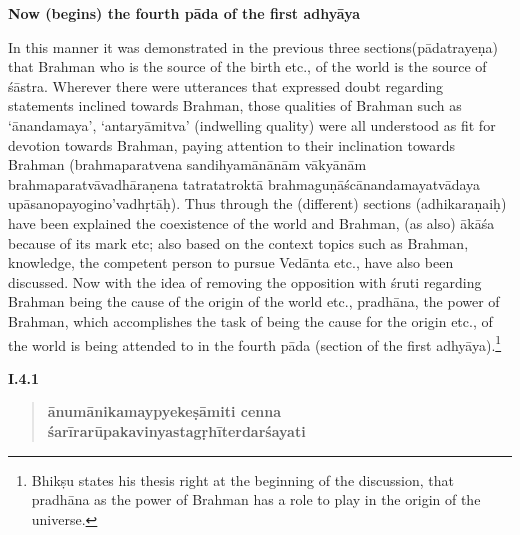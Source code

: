 \textbf{Now (begins) the fourth pāda of the first adhyāya}

In this manner it was demonstrated in the previous three sections\break (pādatrayeṇa) that Brahman who is the source of the birth etc., of the world is the source of śāstra.  Wherever there were utterances that expressed doubt regarding statements inclined towards Brahman, those qualities of Brahman such as ‘ānandamaya’, ‘antaryāmitva’ (indwelling quality) were all understood as fit for devotion towards Brahman, paying attention to their  inclination towards Brahman (brahmaparatvena sandihyamānānām vākyānām brahmaparatvāvadhāraṇena tatra\break tatroktā brahmaguṇāścānandamayatvādaya upāsanopayogino’\-vadhṛ\-tāḥ). Thus through the (different) sections (adhikaraṇaiḥ) have been explained the coexistence of the world and Brahman, (as also) ākāśa because of its mark etc; also based on the context topics such as Brahman, knowledge, the competent person to pursue Vedānta etc., have also been discussed. Now with the idea of removing the opposition with śruti regarding Brahman being the cause of the origin of the world etc., pradhāna, the power of Brahman, which accomplishes the task of being the cause for the origin etc., of the world is being attended to in the fourth pāda (section of the first adhyāya).\footnote{Bhikṣu states his thesis right at the beginning of the discussion, that pradhāna as the power of Brahman has a role to play in the origin of the universe.}

\textbf{I.4.1}
 
\begin{verse}
\textbf{ānumānikamaypyekeṣāmiti cenna} \\
\textbf{śarīrarūpakavinyastagṛhīterdarśayati}
\end{verse}



